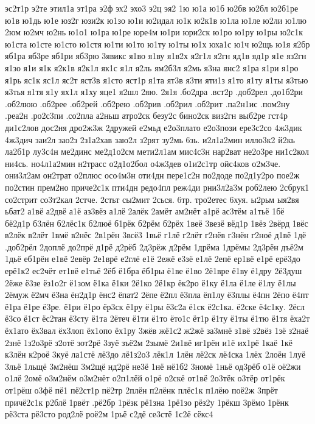 {эс2т1р
э2те
этил1а
эт1ра
э2ф
эх2
эхо3
э2ц
эя2
1ю
ю1а
ю1б
ю2бв
ю2бл
ю2б1ре
ю1в
ю1дь
ю1е
юз2г
юзи2к
ю1зо
ю1и
ю2идал
ю1к
ю2к1в
ю1ла
ю1ле
ю2ли
ю1лю
2юм
ю2мч
ю2нь
ю1о1
ю1ра
ю1ре
юре4м
ю1ри
юри2ск
ю1ро
ю1ру
ю1ры
ю2с1к
ю1ста
ю1сте
ю1сто
ю1стя
ю1ти
ю1то
ю1ту
ю1ты
ю1х
юха1с
ю1ч
ю2щь
ю1я
я2бр
яб1ра
яб3ре
яб1ри
яб3рю
3явикс
я1во
я1ву
я1в2х
я2г1л
я2гн
яд1в
яд1р
я1е
яз2гн
я1зо
я1и
я1к
я2к1в
я2к1л
як1с
я1л
я2ль
ям2б3л
я2мь
я3на
янс2
я1ра
я1ри
я1ро
я1рь
яс1к
яс1л
яс2т
яст3в
я1сто
яст1р
я1та
ят3в
я3ти
яти1з
я1то
я1ту
я1ты
я3тью
я3тья
я1тя
я1у
ях1л
я1ху
яце1
я2шл
2яю.
2я1я
%
.бо2дра
.вст2р
.доб2рел
.до1б2ри
.об2люю
.об2рее
.об2рей
.об2рею
.об2рив
.об2рил
.об2рит
.па2н1ис
.пом2ну
.реа2н
.ро2с3пи
.со2пла
а2ньш
атро2ск
безу2с
бино2ск
виз2гн
выб2ре
гст4р
ди1с2лов
дос2ня
дро2ж3ж
2дружей
е2мьд
е2о3плато
е2о3пози
ере3с2со
4ж3дик
4ж3дич
заи2л
зао2з
2з1а2хав
заю2л
з2рят
зу2мь
6зь.
и2л1а2мин
илло3к2
й2кь
ла2б1р
лу3с4н
ме2динс
ме2д1о2см
мети2л1ам
мис4с3н
нар2ват
не2о3ре
ни1с2кол
ни4сь.
но4л1а2мин
н2трасс
о2д1о2бол
о4ж3дев
о1и2с1тр
ойс4ков
о2м3че.
они3л2ам
он2трат
о2плюс
осо4м3н
оти4дн
пере1с2н
по2доде
по2д1у2ро
пое2ж
по2стин
прем2но
приче2с1к
пти4дн
редо4пл
реж4ди
рни3л2а3м
роб2лею
2сбрук1
со2стрит
со3т2кал
2стче.
2стьт
сы2мит
2сься.
6тр.
тро2етес
6хуя.
ы2рьм
ыя2вя
ьбат2
а1вё
а2двё
а1ё
аз3вёз
а1лё
2алёк
2амёт
ам2нёт
а1рё
ас3тём
а1тьё
1бё
бё2д1р
б3лён
б2лёс1к
б2люё
б1рёк
б2рём
б2рёх
1веё
3везё
вёд1р
1вёз
2вёрд
1вёс
в2лёк
в2лёт
1вмё
в2нёс
2в1рён
3всё3
1вьё
г1лё
г2лёт
г2нёв
г3нён
г2ноё
д1вё
1дё
.доб2рёл
2доплё
до2прё
д1рё
д2рёб
2д3рёж
д2рём
1дрёма
1дрёмы
2д3рён
дъё2м
1дьё
еб1рён
е1вё
2евёр
2е1врё
е2глё
е1ё
2ежё
е3зё
е1лё
2епё
ер1вё
е1рё
ерё3до
ерё1к2
ес2чёт
ет1вё
е1тьё
2ёб
ё1бра
ёб1ры
ё1ве
ё1во
2ё1вре
ё1ву
ё1дру
2ё3душ
2ёже
ё3зе
ёз1о2г
ё1зом
ё1ка
ё1ки
2ё1ко
2ё1кр
ёк2ро
ё1ку
ё1ла
ё1ле
ё1лу
ё1лы
2ёмуж
ё2мч
ё3на
ён2д1р
ёнс2
ёпат2
2ёпе
ё2пл
ё3пла
ёп1лу
ё3плы
ё4пн
2ёпо
ё4пт
ё1ра
ё1ре
ё3ре.
ё1ри
ё1ро
ёр3ск
ё1ру
ё1ры
ё3с2а
ё1ск
ё2с1ка.
ё2ске
ё4с1ку.
2ёсл
ё3со
ё1ст
ёс2тан
ё3сту
ё1та
2ётеч
ё1ти
ё1то
ёто1с
ёт1р
ё1ту
ё1ты
ё1тю
ё1тя
ёха2т
ёх1ато
ёх3вал
ёх3лоп
ёх1опо
ёх1ру
3жёв
жё1с2
ж2жё
за3мнё
з1вё
з2вёз
1зё
з2наё
2знё
1з2о3рё
з2отё
зот2рё
3зуё
зъё2м
2зымё
2и1вё
иг1рён
и1ё
их1рё
1каё
1кё
к3лён
к2роё
3куё
ла1стё
лё3до
лё1з2о3
лёк1л
1лён
лё2ск
лё4ска
1лёх
2лоён
1луё
3льё
1льщё
3м2нёш
3м2щё
нд2рё
не3ё
1нё
нё1б2
3номё
1ньё
од3рёб
о1ё
оё2жи
о1лё
2омё
о3м2нём
о3м2нёт
о2п1лёй
о1рё
о2скё
от1вё
2о3тёк
о3тёр
от1рёк
от1рёш
о3фё
пё1
пё2ст1р
пё2тр
2плён
п2лёнк
плёс1к
п1лёю
поё2ж
3прёт
причё2с1к
р2блё
1рвёт
.рё2бр
1рёзк
рё1зна
1рё1зо
рёз2у
1рёкш
3рёмо
1рёнк
рё3ста
рё3сто
род2лё
роё2м
1рьё
с2дё
се3стё
1с2ё
сёкс4
}
